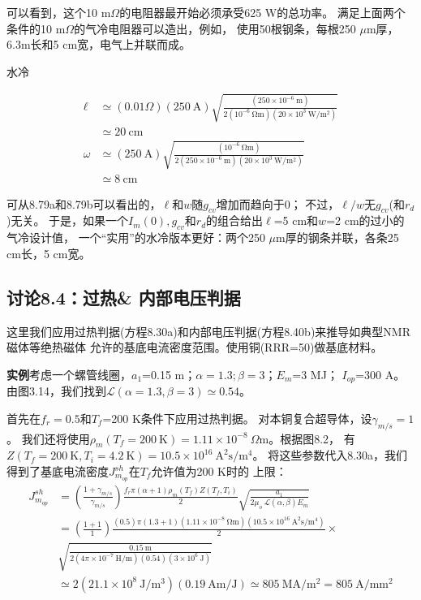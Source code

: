 可以看到，这个10 m$\Omega$的电阻器最开始必须承受625 W的总功率。
满足上面两个条件的10 m$\Omega$的气冷电阻器可以造出，例如，
使用50根钢条，每根250 $\mu$m厚，6.3m长和5 cm宽，电气上并联而成。

水冷\qquad 

\begin{align*}%
\ell&\simeq(0.01\Omega)(250\ \mathrm{A})\sqrt{\frac{(250\times 10^{-6}\ \mathrm{m})}{2(10^{-6}\ \mathrm{\Omega m})(20\times 10^3\ \mathrm{W/m^2})}} \\
&\simeq 20\ \mathrm{cm}\\
\omega&\simeq(250\ \mathrm{A})\sqrt{\frac{(10^{-6}\ \mathrm{\Omega m})}{2(250\times 10^{-6}\ \mathrm{m})(20\times 10^3\ \mathrm{W/m^2})}} \\
&\simeq 8\ \mathrm{cm}
\end{align*}

可从8.79a和8.79b可以看出的，$\ell$和$w$随$g_{cv}$增加而趋向于0；
不过，$\ell/w$无$g_{cv}$(和$r_d$)无关。
于是，如果一个$I_m(0),g_{cv}$和$r_d$的组合给出$\ell$=5 cm和$w$=2 cm的过小的气冷设计值，
一个“实用”的水冷版本更好：两个250 $\mu$m厚的钢条并联，各条25 cm长，5 cm宽。

\subsection{讨论8.4：过热\& 内部电压判据}
这里我们应用过热判据(方程8.30a)和内部电压判据(方程8.40b)来推导如典型NMR磁体等绝热磁体
允许的基底电流密度范围。使用铜(RRR=50)做基底材料。

\textbf{实例}\qquad 考虑一个螺管线圈，$a_1$=0.15 m；$\alpha=1.3;\beta=3$；$E_m$=3 MJ；
$I_{op}$=300 A。
由图3.14，我们找到$\mathcal{L}(\alpha=1.3,\beta=3)\simeq 0.54$。

首先在$f_r=0.5$和$T_f$=200 K条件下应用过热判据。
对本铜复合超导体，设$\gamma_{m/s}=1$。
我们还将使用$\rho_m(T_f=200\ \mathrm{K})=1.11\times 10^{-8}\ \Omega$m。根据图8.2，
有$Z(T_f=200\ \mathrm{K},T_i=4.2\ \mathrm{K})=10.5\times 10^{16}\ \mathrm{A^2 s/m^4}$。
将这些参数代入8.30a，我们得到了基底电流密度$J_{m_{op}}^{sh}$在$T_f$允许值为200 K时的
上限：
\begin{align*}%
J_{m_{op}}^{sh}&=\left(\frac{1+\gamma_{m/s}}{\gamma_{m/s}}\right)\frac{f_r\pi(\alpha+1)\rho_m(T_f)Z(T_f,T_i)}{2}\sqrt{\frac{a_1}{2\mu_o\ \mathcal{L}(\alpha,\beta)E_m}} \\ \tag{8.30a}
&=\left(\frac{1+1}{1}\right)\frac{(0.5)\pi(1.3+1)(1.11\times 10^{-8}\ \mathrm{\Omega m})(10.5\times 10^{16}\ \mathrm{A^2s/m^4})}{2}\times \\
&\sqrt{\frac{0.15\ \mathrm{m}}{2(4\pi\times 10^{-7}\ \mathrm{H/m})(0.54)(3\times 10^6\ \mathrm{J})}} \\
&\simeq 2(21.1\times 10^8\ \mathrm{J/m^3})(0.19\ \mathrm{Am/J})\simeq 805\ \mathrm{MA/m^2}=805\ \mathrm{A/mm^2}
\end{align*}

